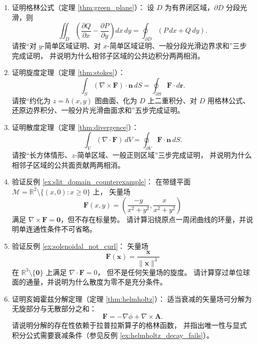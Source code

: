 \begin{enumerate}[leftmargin=3em, label=\textbf{题 \arabic*}]
    \item 证明格林公式（定理 \ref{thm:green_plane}）：
    设 $D$ 为有界闭区域，$\partial D$ 分段光滑，则
    \[
    \iint_D\left(\frac{\partial Q}{\partial x}-\frac{\partial P}{\partial y}\right)dx\,dy
    =\oint_{\partial D}(P\,dx+Q\,dy).
    \]
    请按“对 $y$-简单区域证明、对 $x$-简单区域证明、一般分段光滑边界求和”三步完成证明，
    并说明为什么相邻子区域的公共边积分两两相消。

    \item 证明旋度定理（定理 \ref{thm:stokes}）：
    \[
    \int_S(\nabla\times\mathbf{F})\cdot\mathbf{n}\,dS
    =\oint_{\partial S}\mathbf{F}\cdot d\mathbf{r}.
    \]
    请按“约化为 $z=h(x,y)$ 图曲面、化为 $D$ 上二重积分、对 $D$ 用格林公式、
    还原边界积分、一般分片光滑曲面求和”五步完成证明。

    \item 证明散度定理（定理 \ref{thm:divergence}）：
    \[
    \int_V(\nabla\cdot\mathbf{F})\,dV=\oint_{\partial V}\mathbf{F}\cdot\mathbf{n}\,dS.
    \]
    请按“长方体情形、$z$-简单区域、一般正则区域”三步完成证明，
    并说明为什么相邻子区域的公共面贡献两两相消。

    \item 验证反例 \ref{ex:slit_domain_counterexample}：
    在带缝平面 $\mathcal{M}=\mathbb{R}^2\setminus\{(x,0):x\ge0\}$ 上，
    矢量场
    \[
    \mathbf{F}(x,y)=\left(\frac{-y}{x^2+y^2},\frac{x}{x^2+y^2}\right)
    \]
    满足 $\nabla\times\mathbf{F}=\mathbf{0}$，但不存在标量势。
    请计算沿绕原点一周闭曲线的环量，并说明单连通性条件不可省略。

    \item 验证反例 \ref{ex:solenoidal_not_curl}：
    矢量场
    \[
    \mathbf{F}(\mathbf{x})=\frac{\mathbf{x}}{\|\mathbf{x}\|^3}
    \]
    在 $\mathbb{R}^3\setminus\{\mathbf{0}\}$ 上满足 $\nabla\cdot\mathbf{F}=0$，
    但不是任何矢量场的旋度。
    请计算穿过单位球面的通量，并说明为什么散度为零不是充分条件。

    \item 证明亥姆霍兹分解定理（定理 \ref{thm:helmholtz}）：
    适当衰减的矢量场可分解为无旋部分与无散部分之和：
    \[
    \mathbf{F}=-\nabla\phi+\nabla\times\mathbf{A}.
    \]
    请说明分解的存在性依赖于拉普拉斯算子的格林函数，
    并指出唯一性与显式积分公式需要衰减条件（参见反例 \ref{ex:helmholtz_decay_fails}）。


\end{enumerate}
